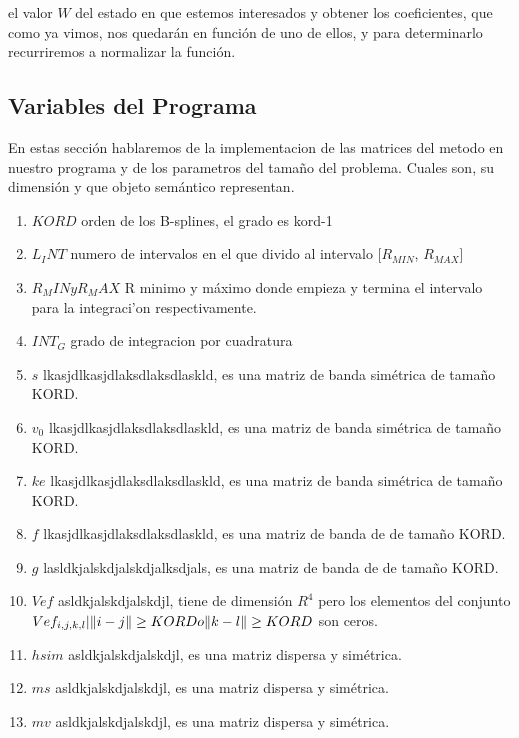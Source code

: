 \documentclass[a4paper,openright,12pt, oneside]{book}
\DeclarePairedDelimiter\norm{\lVert}{\rVert}
\begin{document}
el valor $W$ del estado en que estemos interesados y obtener los coeficientes, que como ya vimos, nos quedar\'an en funci\'on de uno de ellos, y para determinarlo recurriremos a normalizar la funci\'on.


\subsection{Variables del Programa}
En estas secci\'on  hablaremos de la implementacion de las matrices del metodo en nuestro programa y de los parametros del tama\~no del problema. Cuales son, su dimensi\'on y que objeto sem\'antico representan.


\begin{enumerate}
    \item $KORD$ orden de los B-splines, el grado es kord-1
    \item $L_INT$ numero de intervalos en el que divido al intervalo [$R_{MIN}$, $R_{MAX}$]
    \item $R_MIN y R_MAX$ R minimo y m\'aximo donde empieza y termina el intervalo para la integraci'on respectivamente.
    \item $INT_G$ grado de integracion por cuadratura
    \item $s$ lkasjdlkasjdlaksdlaksdlaskld, es una matriz de banda sim\'etrica de tama\~no KORD.
    \item $v_0$ lkasjdlkasjdlaksdlaksdlaskld, es una matriz de banda sim\'etrica de tama\~no KORD.
    \item $ke$ lkasjdlkasjdlaksdlaksdlaskld, es una matriz de banda sim\'etrica de tama\~no KORD.
    \item $f$ lkasjdlkasjdlaksdlaksdlaskld, es una matriz de banda de de tama\~no KORD.
    \item $g$ lasldkjalskdjalskdjalksdjals, es una matriz de banda de de tama\~no KORD.
    \item $Vef$ asldkjalskdjalskdjl, tiene de dimensi\'on $R^4$ pero los elementos del conjunto ${Vef_{i, j, k, l} | \norm{i - j} \geq KORD o \norm{k - l} \geq KORD}$ son ceros.
    \item $hsim$ asldkjalskdjalskdjl, es una matriz dispersa y sim\'etrica.
    \item $ms$ asldkjalskdjalskdjl, es una matriz dispersa y sim\'etrica.
    \item $mv$ asldkjalskdjalskdjl, es una matriz dispersa y sim\'etrica.
\end{enumerate}
\end{document}
